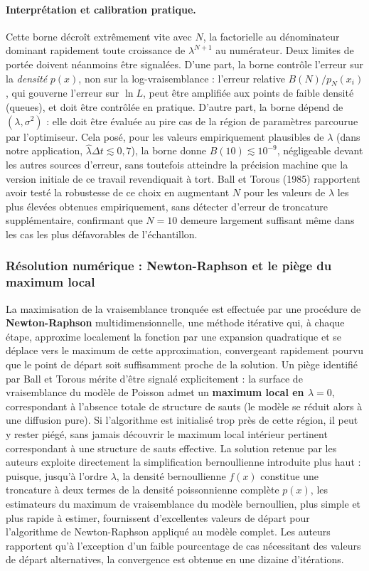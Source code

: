 \documentclass{article}
\begin{document}
\paragraph{Interprétation et calibration pratique.} Cette borne décroît extrêmement vite avec $N$, la factorielle au dénominateur dominant rapidement toute croissance de $\lambda^{N+1}$ au numérateur. Deux limites de portée doivent néanmoins être signalées. D'une part, la borne contrôle l'erreur sur la \emph{densité} $p(x)$, non sur la log-vraisemblance : l'erreur relative $B(N)/p_N(x_i)$, qui gouverne l'erreur sur $\ln L$, peut être amplifiée aux points de faible densité (queues), et doit être contrôlée en pratique. D'autre part, la borne dépend de $(\lambda,\sigma^2)$ : elle doit être évaluée au pire cas de la région de paramètres parcourue par l'optimiseur. Cela posé, pour les valeurs empiriquement plausibles de $\lambda$ (dans notre application, $\hat\lambda\Delta t\lesssim 0{,}7$), la borne donne $B(10)\lesssim 10^{-9}$, négligeable devant les autres sources d'erreur, sans toutefois atteindre la précision machine que la version initiale de ce travail revendiquait à tort. Ball et Torous (1985) rapportent avoir testé la robustesse de ce choix en augmentant $N$ pour les valeurs de $\lambda$ les plus élevées obtenues empiriquement, sans détecter d'erreur de troncature supplémentaire, confirmant que $N=10$ demeure largement suffisant même dans les cas les plus défavorables de l'échantillon.
\subsubsection*{Résolution numérique : Newton-Raphson et le piège du maximum local}
La maximisation de la vraisemblance tronquée est effectuée par une procédure de \textbf{Newton-Raphson} multidimensionnelle, une méthode itérative qui, à chaque étape, approxime localement la fonction par une expansion quadratique et se déplace vers le maximum de cette approximation, convergeant rapidement pourvu que le point de départ soit suffisamment proche de la solution.
Un piège identifié par Ball et Torous mérite d'être signalé explicitement : la surface de vraisemblance du modèle de Poisson admet un \textbf{maximum local en $\lambda=0$}, correspondant à l'absence totale de structure de sauts (le modèle se réduit alors à une diffusion pure). Si l'algorithme est initialisé trop près de cette région, il peut y rester piégé, sans jamais découvrir le maximum local intérieur pertinent correspondant à une structure de sauts effective.
La solution retenue par les auteurs exploite directement la simplification bernoullienne introduite plus haut : puisque, jusqu'à l'ordre $\lambda$, la densité bernoullienne $f(x)$ constitue une troncature à deux termes de la densité poissonnienne complète $p(x)$, les estimateurs du maximum de vraisemblance du modèle bernoullien, plus simple et plus rapide à estimer, fournissent d'excellentes valeurs de départ pour l'algorithme de Newton-Raphson appliqué au modèle complet. Les auteurs rapportent qu'à l'exception d'un faible pourcentage de cas nécessitant des valeurs de départ alternatives, la convergence est obtenue en une dizaine d'itérations.
\end{document}
